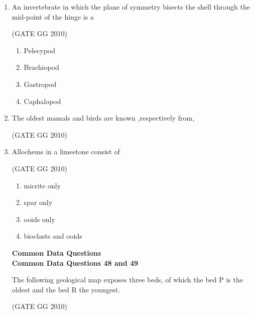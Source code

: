 \documentclass[journal]{IEEEtran}
\begin{document}
\begin{enumerate}[start=1]
\item An invertebrate in which the plane of symmetry bisects the shell through the mid-point of the hinge is a

\hfill{(GATE GG 2010)}\\

\begin{enumerate}
    \item Pelecypod
    \item Brachiopod
    \item Gastropod
    \item Caphalopod
\end{enumerate}

\item The oldest mamals and birds are known ,respectively from,

\hfill{(GATE GG 2010)}

 \begin{enumerate}
\end{enumerate}


\item Allochems in a limestone consist of

\hfill{(GATE GG 2010)}\\

\begin{enumerate}
    \item micrite only
    \item spar only
    \item ooids only
    \item bioclasts and ooids
\end{enumerate}
\vspace{0.7cm}
\textbf{Common Data Questions}\\
\vspace{0.6cm}
\textbf{Common Data Questions 48 and 49}

 The following geological map exposes three beds, of which the bed P is the oldest and the bed R the youngest.
 
\hspace*{15.7cm}(GATE GG 2010)


\end{enumerate}
\end{document}

